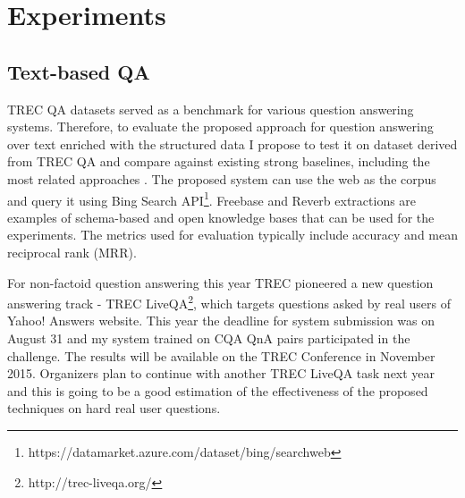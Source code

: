 %



\noindent

\section{Experiments}

\subsection{Text-based QA}

TREC QA datasets served as a benchmark for various question answering systems.
Therefore, to evaluate the proposed approach for question answering over text enriched with the structured data I propose to test it on dataset derived from TREC QA and compare against existing strong baselines, including the most related approaches \cite{Fader:2014:OQA:2623330.2623677,Sun:2015:ODQ:2736277.2741651}.
The proposed system can use the web as the corpus and query it using Bing Search API\footnote{https://datamarket.azure.com/dataset/bing/searchweb}.
Freebase and Reverb extractions \cite{FaderSE11} are examples of schema-based and open knowledge bases that can be used for the experiments.
The metrics used for evaluation typically include accuracy and mean reciprocal rank (MRR).

For non-factoid question answering this year TREC pioneered a new question answering track - TREC LiveQA\footnote{http://trec-liveqa.org/}, which targets questions asked by real users of Yahoo! Answers website.
This year the deadline for system submission was on August 31 and my system trained on CQA QnA pairs participated in the challenge.
The results will be available on the TREC Conference in November 2015.
Organizers plan to continue with another TREC LiveQA task next year and this is going to be a good estimation of the effectiveness of the proposed techniques on hard real user questions.

